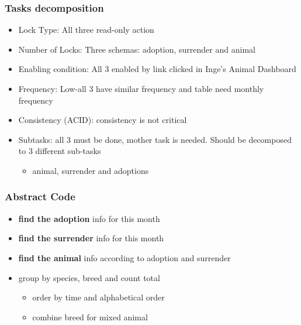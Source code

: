 \documentclass[a4paper]{article}
\begin{document}
\subsubsection*{Tasks decomposition}
\begin{itemize}
	\item Lock Type: All three read-only action
    \item Number of Locks: Three schemas: adoption, surrender and animal
    \item Enabling condition: All 3 enabled by link clicked in Inge's Animal Dashboard
    \item Frequency: Low-all 3 have similar frequency and table need monthly frequency
    \item Consistency (ACID): consistency is not critical
    \item Subtasks: all 3 must be done, mother task is needed. Should be decomposed to 3 different sub-tasks
    \begin{itemize}
        \item animal, surrender and adoptions
    \end{itemize}

\end{itemize}

\subsubsection*{Abstract Code}

\begin{itemize}
	\item \textbf{find the adoption} info for this month
	\item \textbf{find the surrender} info for this month
    \item \textbf{find the animal} info according to adoption and surrender
\item group by species, breed and count total
    \begin{itemize}
        \item  order by time and alphabetical order
        \item combine breed for mixed animal

    \end{itemize}




\end{itemize}
\end{document}
